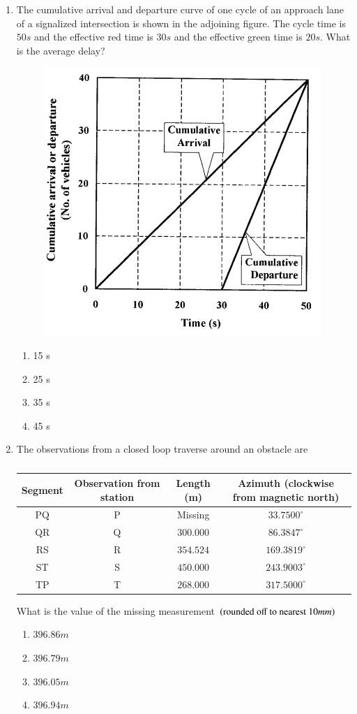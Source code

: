 \documentclass[journal,12pt,onecolumn]{IEEEtran}
\theoremstyle{remark}
\begin{document}
\begin{enumerate}
\item The cumulative arrival and departure curve of one cycle of an approach lane of a signalized intersection is shown in the adjoining figure. The cycle time is $50 s$ and the effective red time is $30 s$ and the effective green time is $20 s$. What is the average delay?

\hfill{}
\begin{figure}[H]
\centering
\includegraphics[width=0.3\columnwidth]{figs/q46.png}
\caption*{}
\label{fig:Q.46}
\end{figure}
\begin{enumerate}
\item 15 s
\item 25 s
\item 35 s
\item 45 s
\end{enumerate}

\item The observations from a closed loop traverse around an obstacle are

\begin{table}[H]
\centering
\begin{tabular}{|c|c|c|c|}
\hline
Segment & Observation from station & Length (m) & Azimuth (clockwise from magnetic north) \\
\hline
PQ & P & Missing & $33.7500^\circ$ \\
\hline
QR & Q & $300.000$ & $86.3847^\circ$ \\
\hline
RS & R & $354.524$ & $169.3819^\circ$ \\
\hline
ST & S & $450.000$ & $243.9003^\circ$ \\
\hline
TP & T & $268.000$ & $317.5000^\circ$ \\
\hline
\end{tabular}
\caption*{}
\label{tab:Q.47}
\end{table}
What is the value of the missing measurement $\left(\text{rounded off to nearest }10mm\right)$

\hfill{}
\begin{enumerate}
\item $ 396.86 m$
\item $396.79 m$
\item $396.05 m$
\item $396.94 m$
\end{enumerate}


\end{enumerate}
\end{document}
